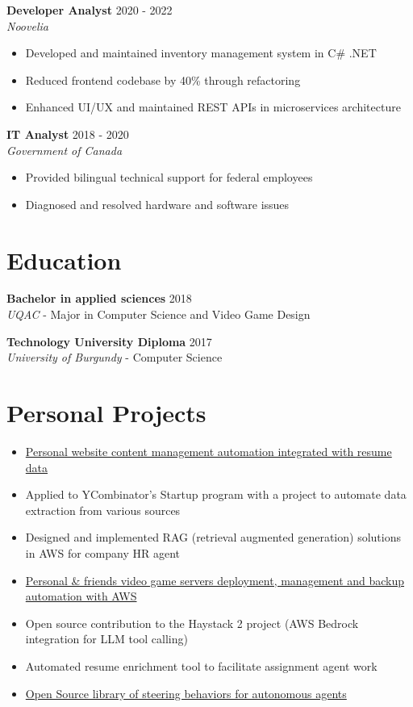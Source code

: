 ﻿\documentclass[11pt,letterpaper]{article}
\begin{document}
\textbf{Developer Analyst} \hfill 2020 - 2022\\
\textit{Noovelia}
\begin{itemize}
\item Developed and maintained inventory management system  in C\# .NET
\item Reduced frontend codebase by 40\% through refactoring
\item Enhanced UI/UX and maintained REST APIs in microservices architecture
\end{itemize}

\textbf{IT Analyst} \hfill 2018 - 2020\\
\textit{Government of Canada}
\begin{itemize}
\item Provided bilingual technical support for federal employees
\item Diagnosed and resolved hardware and software issues
\end{itemize}

\section*{Education}
\textbf{Bachelor in applied sciences} \hfill 2018\\
\textit{UQAC} - Major in Computer Science and Video Game Design

\textbf{Technology University Diploma} \hfill 2017\\
\textit{University of Burgundy} - Computer Science

\section*{Personal Projects}
\begin{itemize}
\item \href{https://github.com/FloRul/portfolio}{Personal website content management automation integrated with resume data}
\item Applied to YCombinator's Startup program with a project to automate data extraction from various sources
\item Designed and implemented RAG (retrieval augmented generation) solutions in AWS for company HR agent
\item \href{https://github.com/FloRul/Satiserver}{Personal \& friends video game servers deployment, management and backup automation with AWS}
\item Open source contribution to the Haystack 2 project (AWS Bedrock integration for LLM tool calling)
\item Automated resume enrichment tool to facilitate assignment agent work
\item \href{https://github.com/FloRul/RitFlocking}{Open Source library of steering behaviors for autonomous agents}
\end{itemize}
\end{document}
